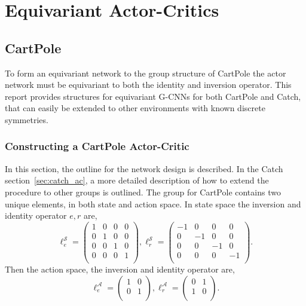 \section{Equivariant Actor-Critics}\label{sec:actor-critic}
\subsection{CartPole}

To form an equivariant network to the group structure of CartPole the actor network must be equivariant to both the identity and inversion operator. This report provides structures for equivariant G-CNNs for both CartPole and Catch, that can easily be extended to other environments with known discrete symmetries.

\subsubsection{Constructing a CartPole Actor-Critic}
In this section, the outline for the network design is described. In the Catch section~\ref{sec:catch_ac}, a more detailed description of how to extend the procedure to other groups is outlined.
The group for CartPole contains two unique elements, in both state and action space. In state space the inversion and identity operator $e, r$ are,
\begin{equation}
	\ell^\mathcal{S}_e =
	\begin{pmatrix}
		1 & 0 & 0 & 0 \\
		0 & 1 & 0 & 0 \\
		0 & 0 & 1 & 0 \\
		0 & 0 & 0 & 1 \\
	\end{pmatrix},
	\ell^\mathcal{S}_r =
	\begin{pmatrix}
		-1 & 0  & 0  & 0  \\
		0  & -1 & 0  & 0  \\
		0  & 0  & -1 & 0  \\
		0  & 0  & 0  & -1 \\
	\end{pmatrix}.
\end{equation}
Then the action space, the inversion and identity operator are,
\begin{equation}
	\ell^\mathcal{A}_e =
	\begin{pmatrix}
		1 & 0 \\
		0 & 1 \\
	\end{pmatrix},
	\ell^\mathcal{A}_r =
	\begin{pmatrix}
		0 & 1 \\
		1 & 0 \\
	\end{pmatrix}.
\end{equation}
